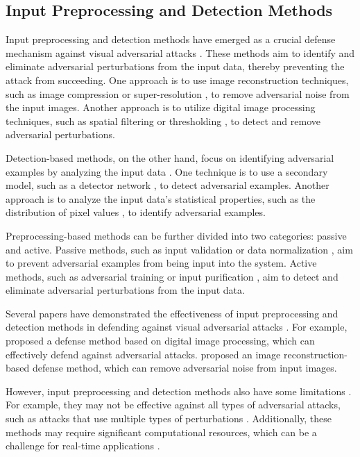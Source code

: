 \documentclass[11pt]{article}
\begin{document}
\subsection{Input Preprocessing and Detection Methods}

Input preprocessing and detection methods have emerged as a crucial defense mechanism against visual adversarial attacks \cite{ref127}. These methods aim to identify and eliminate adversarial perturbations from the input data, thereby preventing the attack from succeeding. One approach is to use image reconstruction techniques, such as image compression \cite{ref127} or super-resolution \cite{ref127}, to remove adversarial noise from the input images. Another approach is to utilize digital image processing techniques, such as spatial filtering \cite{ref128} or thresholding \cite{ref128}, to detect and remove adversarial perturbations.

Detection-based methods, on the other hand, focus on identifying adversarial examples by analyzing the input data \cite{ref129}. One technique is to use a secondary model, such as a detector network \cite{ref129}, to detect adversarial examples. Another approach is to analyze the input data's statistical properties, such as the distribution of pixel values \cite{ref130}, to identify adversarial examples.

Preprocessing-based methods can be further divided into two categories: passive and active. Passive methods, such as input validation \cite{ref131} or data normalization \cite{ref131}, aim to prevent adversarial examples from being input into the system. Active methods, such as adversarial training \cite{ref106} or input purification \cite{ref132}, aim to detect and eliminate adversarial perturbations from the input data.

Several papers have demonstrated the effectiveness of input preprocessing and detection methods in defending against visual adversarial attacks \cite{ref128,ref127}. For example, \cite{ref128} proposed a defense method based on digital image processing, which can effectively defend against adversarial attacks. \cite{ref127} proposed an image reconstruction-based defense method, which can remove adversarial noise from input images.

However, input preprocessing and detection methods also have some limitations \cite{ref133}. For example, they may not be effective against all types of adversarial attacks, such as attacks that use multiple types of perturbations \cite{ref133}. Additionally, these methods may require significant computational resources, which can be a challenge for real-time applications \cite{ref134}.
\end{document}
